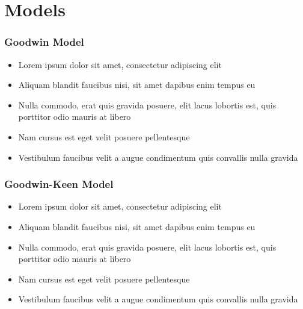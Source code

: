 \documentclass{beamer}
\begin{document}
\section{Models}
\begin{frame}
\frametitle{Goodwin Model}
\begin{itemize}
\item Lorem ipsum dolor sit amet, consectetur adipiscing elit
\item Aliquam blandit faucibus nisi, sit amet dapibus enim tempus eu
\item Nulla commodo, erat quis gravida posuere, elit lacus lobortis est, quis porttitor odio mauris at libero
\item Nam cursus est eget velit posuere pellentesque
\item Vestibulum faucibus velit a augue condimentum quis convallis nulla gravida
\end{itemize}
\end{frame}

\begin{frame}
\frametitle{Goodwin-Keen Model}
\begin{itemize}
\item Lorem ipsum dolor sit amet, consectetur adipiscing elit
\item Aliquam blandit faucibus nisi, sit amet dapibus enim tempus eu
\item Nulla commodo, erat quis gravida posuere, elit lacus lobortis est, quis porttitor odio mauris at libero
\item Nam cursus est eget velit posuere pellentesque
\item Vestibulum faucibus velit a augue condimentum quis convallis nulla gravida
\end{itemize}
\end{frame}
\end{document}
